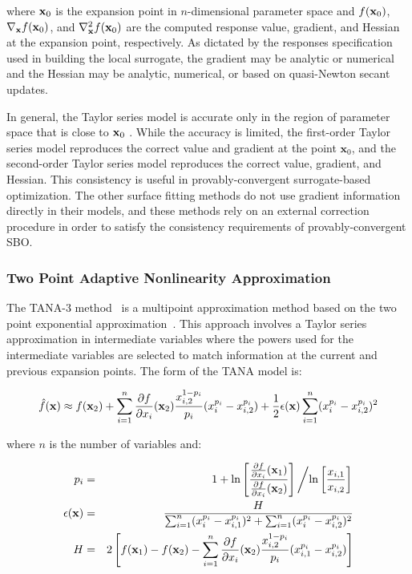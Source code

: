 where ${\bf x}_0$ is the expansion point in $n$-dimensional parameter
space and $f({\bf x}_0)$, $\nabla_{\bf x} f({\bf x}_0)$, and
$\nabla^2_{\bf x} f({\bf x}_0)$ are the computed response value,
gradient, and Hessian at the expansion point, respectively.  As
dictated by the responses specification used in building the local
surrogate, the gradient may be analytic or numerical and the Hessian
may be analytic, numerical, or based on quasi-Newton secant updates.

In general, the Taylor series model is accurate only in the region of
parameter space that is close to ${\bf x}_0$ . While the accuracy is
limited, the first-order Taylor series model reproduces the correct
value and gradient at the point $\mathbf{x}_{0}$, and the second-order
Taylor series model reproduces the correct value, gradient, and
Hessian. This consistency is useful in provably-convergent
surrogate-based optimization. The other surface fitting methods do not
use gradient information directly in their models, and these methods
rely on an external correction procedure in order to satisfy the
consistency requirements of provably-convergent SBO.

\subsubsection{Two Point Adaptive Nonlinearity Approximation}\label{models:surf:tana}

The TANA-3 method~\cite{Xu98} is a multipoint approximation method
based on the two point exponential approximation~\cite{Fad90}. This
approach involves a Taylor series approximation in intermediate
variables where the powers used for the intermediate variables are
selected to match information at the current and previous expansion
points.  The form of the TANA model is:

\begin{equation}
\hat{f}({\bf x}) \approx f({\bf x}_2) + \sum_{i=1}^n 
\frac{\partial f}{\partial x_i}({\bf x}_2) \frac{x_{i,2}^{1-p_i}}{p_i} 
(x_i^{p_i} - x_{i,2}^{p_i}) + \frac{1}{2} \epsilon({\bf x}) \sum_{i=1}^n 
(x_i^{p_i} - x_{i,2}^{p_i})^2 \label{eq:tana_f}
\end{equation}

where $n$ is the number of variables and:

\begin{eqnarray}
p_i & = & 1 + \ln \left[ \frac{\frac{\partial f}{\partial x_i}({\bf x}_1)}
{\frac{\partial f}{\partial x_i}({\bf x}_2)} \right] \left/ 
\ln \left[ \frac{x_{i,1}}{x_{i,2}} \right] \right. \label{eq:tana_pi} \\
\epsilon({\bf x}) & = & \frac{H}{\sum_{i=1}^n (x_i^{p_i} - x_{i,1}^{p_i})^2 + 
\sum_{i=1}^n (x_i^{p_i} - x_{i,2}^{p_i})^2} \label{eq:tana_eps} \\
H & = & 2 \left[ f({\bf x}_1) - f({\bf x}_2) - \sum_{i=1}^n 
\frac{\partial f}{\partial x_i}({\bf x}_2) \frac{x_{i,2}^{1-p_i}}{p_i} 
(x_{i,1}^{p_i} - x_{i,2}^{p_i}) \right] \label{eq:tana_H}
\end{eqnarray}

